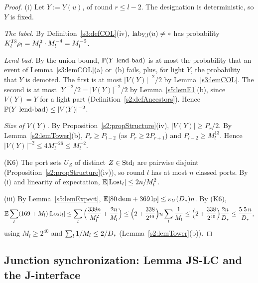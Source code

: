 \begin{proof}
(i) Let $Y:=Y(u)$, of round $r\le l-2$. The designation is deterministic, so $Y$ is fixed.

\emph{The label.} By Definition~\ref{s3:defCOL}(iv), $\mathrm{lab}_{Y,l}(u)\neq*$ has probability $K^{\mathrm{JS}}_l\rho_l=M_l^2\cdot M_l^{-4}=M_l^{-2}$.

\emph{Lend-bad.} By the union bound, $\mathbb{P}(Y\text{ lend-bad})$ is at most the probability that an event of Lemma~\ref{s3:lemCOL}(a) or~(b) fails, plus, for light $Y$, the probability that $Y$ is demoted. The first is at most $|V(Y)|^{-2}/2$ by Lemma~\ref{s3:lemCOL}. The second is at most $|Y|^{-2}/2=|V(Y)|^{-2}/2$ by Lemma~\ref{s5:lemE1}(b), since $V(Y)=Y$ for a light part (Definition~\ref{s2:defAncestors}). Hence $\mathbb{P}(Y\text{ lend-bad})\le|V(Y)|^{-2}$.

\emph{Size of $V(Y)$.} By Proposition~\ref{s2:propStructure}(iv), $|V(Y)|\ge P_r/2$. By Lemma~\ref{s2:lemTower}(b), $P_r\ge P_{l-2}$ (as $P_r\ge2P_{r+1}$) and $P_{l-2}\ge M_l^{13}$. Hence $|V(Y)|^{-2}\le4M_l^{-26}\le M_l^{-2}$.

(K6) The port sets $U_Z$ of distinct $Z\in\mathrm{Std}_l$ are pairwise disjoint (Proposition~\ref{s2:propStructure}(iv)), so round $l$ has at most $n$ classed ports. By (i) and linearity of expectation, $\mathbb{E}|\mathrm{Lost}_l|\le2n/M_l^2$.

(iii) By Lemma~\ref{s5:lemExpect}, $\mathbb{E}[80\,\mathrm{dem}+369\,\mathrm{lp}]\le\varepsilon_{U}(D_{*})n$. By (K6),
\[
\mathbb{E}\sum_l(169+M_l)|\mathrm{Lost}_l|\le\sum_l\Big(\frac{338n}{M_l^2}+\frac{2n}{M_l}\Big)\le\Big(2+\frac{338}{2^{40}}\Big)n\sum_l\frac1{M_l}\le\Big(2+\frac{338}{2^{40}}\Big)\frac{2n}{D_{*}}\le\frac{5.5\,n}{D_{*}},
\]
using $M_l\ge2^{40}$ and $\sum_l1/M_l\le2/D_{*}$ (Lemma~\ref{s2:lemTower}(b)).
\end{proof}

\subsection{Junction synchronization: Lemma JS-LC and the J-interface}

